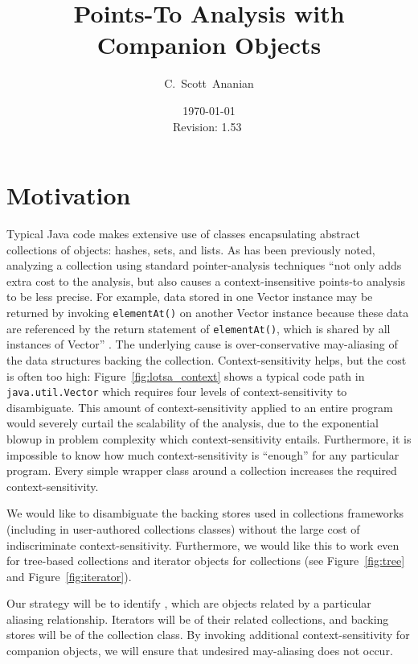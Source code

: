 \documentclass[11pt,notitlepage]{article}
\author{C.~Scott~Ananian}
\title{Points-To Analysis with Companion Objects}
\date{\today \\ $ $Revision: 1.53 $ $}
\begin{document}

\maketitle
\section{Motivation}
Typical Java code makes extensive use of classes encapsulating abstract
collections of objects: hashes, sets, and lists.  As has been
previously noted, analyzing a collection using standard pointer-analysis
techniques ``not only adds extra cost to the analysis, but also causes
a context-insensitive points-to analysis to be less precise.  For
example, data stored in one Vector instance may be returned by
invoking \texttt{elementAt()} on another Vector instance because these
data are referenced by the return statement of \texttt{elementAt()},
which is shared by all instances of Vector'' \cite[p. 75]{379676}.
The underlying cause is over-conservative may-aliasing of the data
structures backing the collection.  Context-sensitivity helps, but the
cost is often too high: Figure~\ref{fig:lotsa_context} shows a typical
code path in \texttt{java.util.Vector} which requires four levels of
context-sensitivity to disambiguate.  This amount of
context-sensitivity applied to an entire program would severely
curtail the scalability of the analysis, due to the exponential blowup
in problem complexity which context-sensitivity entails.  Furthermore,
it is impossible to know how much context-sensitivity is ``enough''
for any particular program.  Every simple wrapper class around a
collection increases the required context-sensitivity.

We would like to disambiguate the backing stores used in collections
frameworks (including in user-authored collections classes) without
the large cost of indiscriminate context-sensitivity.  Furthermore, we
would like this to work even for tree-based collections and iterator
objects for collections (see Figure~\ref{fig:tree} and
Figure~\ref{fig:iterator}).

Our strategy will be to identify , which
are objects related by a particular aliasing relationship.  Iterators
will be  of their related collections, and
backing stores will be  of the collection
class.  By invoking additional context-sensitivity for companion
objects, we will ensure that undesired may-aliasing does not occur.
\end{document}
